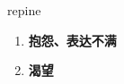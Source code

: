 
\begin{frame}
{\huge repine}
\begin{center}
\begin{enumerate}\Large
  \item \textbf{抱怨、表达不满}
  \item \textbf{渴望}
\end{enumerate}
\end{center}
\end{frame}

